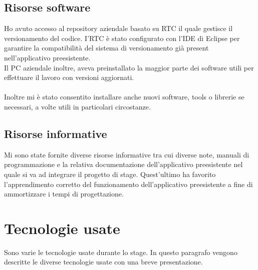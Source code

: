 \subsection{Risorse software}
Ho avuto accesso al repository aziendale basato su RTC il quale gestisce il versionamento del codice. I'RTC è stato configurato con l'IDE di Eclipse per garantire la compatibilità del sistema di versionamento già present nell'applicativo preesistente. \\
Il PC aziendale inoltre, aveva preinstallato la maggior parte dei software utili per effettuare il lavoro con versioni aggiornati. \\\\
Inoltre mi è stato consentito installare anche nuovi software, tools o librerie se necessari, a volte utili in particolari circostanze.

\subsection{Risorse informative}
Mi sono state fornite diverse risorse informative tra cui diverse note, manuali di programmazione  e la relativa documentazione dell'applicativo preesistente nel quale si va ad integrare il progetto di stage. Quest'ultimo ha favorito l'apprendimento corretto del funzionamento dell'applicativo preesistente a fine di ammortizzare i tempi di progettazione. 
\section{Tecnologie usate}
Sono varie le tecnologie usate durante lo stage. In questo paragrafo vengono descritte le diverse tecnologie usate con una breve presentazione. \\\\

